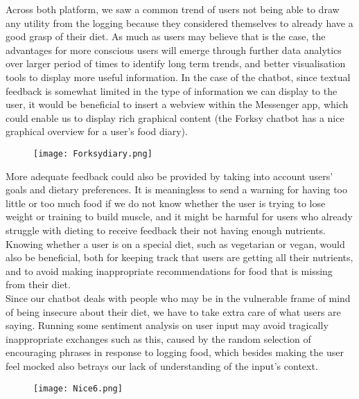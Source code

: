 Across both platform, we saw a common trend of users not being able to draw any utility from the logging because they considered themselves to already have a good grasp of their diet. As much as users may believe that is the case, the advantages for more conscious users will emerge through further data analytics over larger period of times to identify long term trends, and better visualisation tools to display more useful information. In the case of the chatbot, since textual feedback is somewhat limited in the type of information we can display to the user, it would be beneficial to insert a webview within the Messenger app, which could enable us to display rich graphical content (the Forksy chatbot has a nice graphical overview for a user's food diary). \\

\begin{figure}[h!]
  \centering
  \texttt{[image: Forksydiary.png]}
\end{figure} 

More adequate feedback could also be provided by taking into account users' goals and dietary preferences. It is meaningless to send a warning for having too little or too much food if we do not know whether the user is trying to lose weight or training to build muscle, and it might be harmful for users who already struggle with dieting to receive feedback their not having enough nutrients. Knowing whether a user is on a special diet, such as vegetarian or vegan, would also be beneficial, both for keeping track that users are getting all their nutrients, and to avoid making inappropriate recommendations for food that is missing from their diet. \\
Since our chatbot deals with people who may be in the vulnerable frame of mind of being insecure about their diet, we have to take extra care of what users are saying. Running some sentiment analysis on user input may avoid tragically inappropriate exchanges such as this, caused by the random selection of encouraging phrases in response to logging food, which besides making the user feel mocked also betrays our lack of understanding of the input's context. \\

\begin{figure}[h!]
  \texttt{[image: Nice6.png]}
\end{figure}

